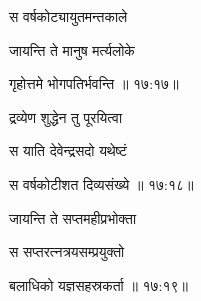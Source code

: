 \nemslokab

{\devanagarifont स वर्षकोट्यायुतमन्तकाले  \danda\dontdisplaylinenum }%
 
\nemslokac

{\devanagarifont जायन्ति ते मानुष मर्त्यलोके }%
  \dontdisplaylinenum    {}%



\nemslokad

{\devanagarifont गृहोत्तमे भोगपतिर्भवन्ति {॥ १७:१७॥} \veg\dontdisplaylinenum }%

\ujvers{}

\nemslokab

{\devanagarifont द्रव्येण शुद्धेन तु पूरयित्वा  \danda\dontdisplaylinenum }%
 
\nemslokac

{\devanagarifont स याति देवेन्द्रसदो यथेष्टं }%
  \dontdisplaylinenum    {}%



\nemslokad

{\devanagarifont स वर्षकोटीशत दिव्यसंख्ये {॥ १७:१८॥} \veg\dontdisplaylinenum }%

\ujvers{}

\nemslokab

{\devanagarifont जायन्ति ते सप्तमहीप्रभोक्ता  \danda\dontdisplaylinenum }%
 
\nemslokac

{\devanagarifont स सप्तरत्नत्रयसम्प्रयुक्तो }%
  \dontdisplaylinenum    {}%



\nemslokad

{\devanagarifont बलाधिको यज्ञसहस्रकर्ता {॥ १७:१९॥} \veg\dontdisplaylinenum }%
 

\ujvers{}    %


